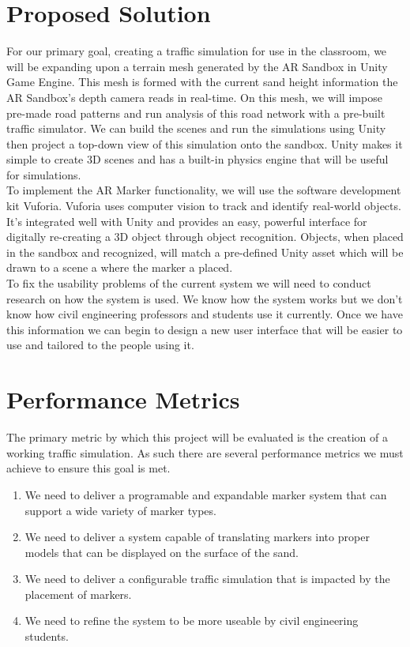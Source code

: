 \documentclass[letterpaper, 10pt, onecolumn, draftclsnofoot]{IEEEtran}
\begin{document}
\section{Proposed Solution}
For our primary goal, creating a traffic simulation for use in the classroom, we will be expanding upon a terrain mesh generated by the AR Sandbox in Unity Game Engine. This mesh is formed with the current sand height information the AR Sandbox’s depth camera reads in real-time. On this mesh, we will impose pre-made road patterns and run analysis of this road network with a pre-built traffic simulator. We can build the scenes and run the simulations using Unity then project a top-down view of this simulation onto the sandbox. Unity makes it simple to create 3D scenes and has a built-in physics engine that will be useful for simulations.
\\
To implement the AR Marker functionality, we will use the software development kit Vuforia. Vuforia uses computer vision to track and identify real-world objects. It's integrated well with Unity and provides an easy, powerful interface for digitally re-creating a 3D object through object recognition. Objects, when placed in the sandbox and recognized, will match a pre-defined Unity asset which will be drawn to a scene a where the marker a placed.
\\
To fix the usability problems of the current system we will need to conduct research on how the system is used. We know how the system works but we don't know how civil engineering professors and students use it currently. Once we have this information we can begin to design a new user interface that will be easier to use and tailored to the people using it.

\section{Performance Metrics}
The primary metric by which this project will be evaluated is the creation of a working traffic simulation. As such there are several performance metrics we must achieve to ensure this goal is met. 
\\
\begin{enumerate}
	\item{}
	We need to deliver a programable and expandable marker system that can support a wide variety of marker types.
	\item{}
	We need to deliver a system capable of translating markers into proper models that can be displayed on the surface of the sand.
	\item{}
	We need to deliver a configurable traffic simulation that is impacted by the placement of markers.
	\item{}
	We need to refine the system to be more useable by civil engineering students.
\end{enumerate}
\end{document}
